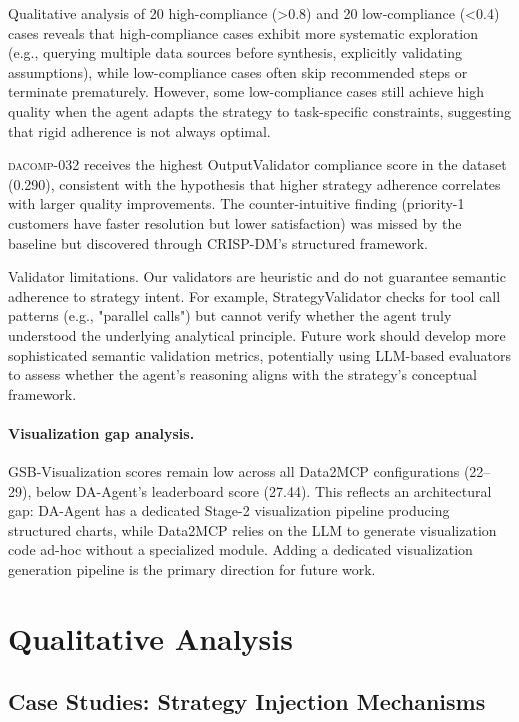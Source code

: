 Qualitative analysis of 20 high-compliance (>0.8) and 20 low-compliance (<0.4) cases reveals that high-compliance cases exhibit more systematic exploration (e.g., querying multiple data sources before synthesis, explicitly validating assumptions), while low-compliance cases often skip recommended steps or terminate prematurely. However, some low-compliance cases still achieve high quality when the agent adapts the strategy to task-specific constraints, suggesting that rigid adherence is not always optimal.

\textsc{dacomp-032} receives the highest OutputValidator compliance score in the dataset (0.290), consistent with the hypothesis that higher strategy adherence correlates with larger quality improvements. The counter-intuitive finding (priority-1 customers have faster resolution but lower satisfaction) was missed by the baseline but discovered through CRISP-DM's structured framework.

Validator limitations. Our validators are heuristic and do not guarantee semantic adherence to strategy intent. For example, StrategyValidator checks for tool call patterns (e.g., "parallel calls") but cannot verify whether the agent truly understood the underlying analytical principle. Future work should develop more sophisticated semantic validation metrics, potentially using LLM-based evaluators to assess whether the agent's reasoning aligns with the strategy's conceptual framework.

\paragraph{Visualization gap analysis.}
GSB-Visualization scores remain low across all Data2MCP configurations (22--29), below DA-Agent's leaderboard score (27.44). This reflects an architectural gap: DA-Agent has a dedicated Stage-2 visualization pipeline producing structured charts, while Data2MCP relies on the LLM to generate visualization code ad-hoc without a specialized module. Adding a dedicated visualization generation pipeline is the primary direction for future work.

\section{Qualitative Analysis}
\label{app:qualitative}
\FloatBarrier

\subsection{Case Studies: Strategy Injection Mechanisms}
\label{app:cases}

